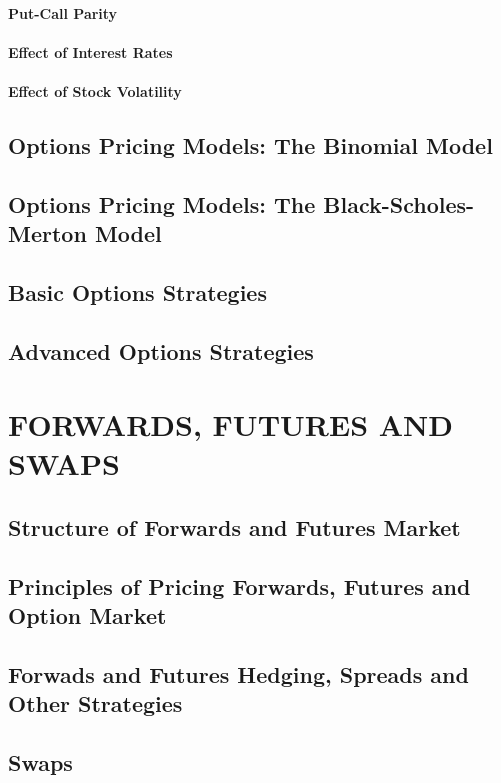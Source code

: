 \documentclass{book}
\theoremstyle{definition}
\theoremstyle{remark}
\begin{document}
        \subsubsection{Put-Call Parity}
        \subsubsection{Effect of Interest Rates}
        \subsubsection{Effect of Stock Volatility}
        
\section{Options Pricing Models: The Binomial Model}

\section{Options Pricing Models: The Black-Scholes-Merton Model}

\section{Basic Options Strategies}

\section{Advanced Options Strategies}
    
    
\newpage
\chapter{FORWARDS, FUTURES AND SWAPS}
\section{Structure of Forwards and Futures Market}
\section{Principles of Pricing Forwards, Futures and Option Market}
\section{Forwads and Futures Hedging, Spreads and Other Strategies}
\section{Swaps}
\end{document}

